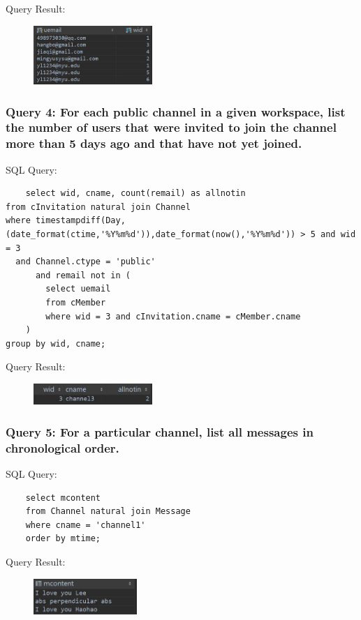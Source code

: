 Query Result:
\begin{figure}[ht!]
    \centering
    \includegraphics[width=0.4\textwidth]{img/sql3.JPG}
\end{figure}

\subsubsection{Query 4: For each public channel in a given workspace, list the number of users that were invited to join the channel more than
5 days ago and that have not yet joined.}
SQL Query:
\begin{verbatim}
    select wid, cname, count(remail) as allnotin
from cInvitation natural join Channel
where timestampdiff(Day, (date_format(ctime,'%Y%m%d')),date_format(now(),'%Y%m%d')) > 5 and wid = 3
  and Channel.ctype = 'public'
      and remail not in (
        select uemail
        from cMember
        where wid = 3 and cInvitation.cname = cMember.cname
    )
group by wid, cname;
\end{verbatim}

Query Result:
\begin{figure}[ht!]
    \centering
    \includegraphics[width=0.4\textwidth]{img/sql4.JPG}
\end{figure}

\subsubsection{Query 5: For a particular channel, list all messages in chronological order.}
SQL Query:
\begin{verbatim}
    select mcontent
    from Channel natural join Message
    where cname = 'channel1'
    order by mtime;
\end{verbatim}

Query Result:
\begin{figure}[ht!]
    \centering
    \includegraphics[width=0.35\textwidth]{img/sql5.JPG}
\end{figure}

